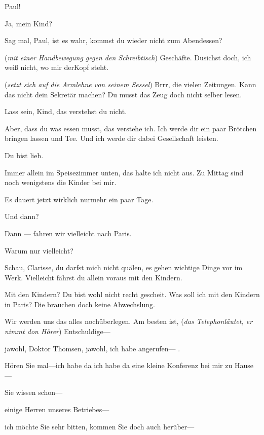 \documentclass[
	final,
	a4paper,
	ngerman,
	mpinclude = true, %
	twoside = true,
	open = right,
	cleardoublepage = plain,
	DIV = 13,
	BCOR = 1cm,
	titlepage = firstiscover,
	]{scrbook}
\newcommand{\direction}[1]{(\textit{#1})}
\newcommand{\thecharacter}[1]{\textup{\textsc{#1}}\xspace}
\newcommand{\theClarisse}{\thecharacter{Clarisse}}
\newcommand{\character}[1]{\item[#1]}
\newcommand{\Generaldirektor}{\character{Direktor}}
\newcommand{\Clarisse}{\character{\theClarisse}}
\begin{document}
\begin{play}

\Clarisse
Paul!

\Generaldirektor
Ja, mein Kind?

\Clarisse
Sag mal, Paul, ist es wahr, kommst du wieder nicht zum Abendessen?

\Generaldirektor
\direction{mit einer Handbewegung gegen den Schreibtisch} Geschäfte. Dusichst doch, ich weiß nicht, wo mir derKopf steht.

\Clarisse
\direction{setzt sich auf die Armlehne von seinem Sessel} Brrr, die vielen Zeitungen. Kann das nicht dein Sekretär machen? Du musst das Zeug doch nicht selber lesen.

\Generaldirektor
Lass sein, Kind, das verstehst du nicht.

\Clarisse
Aber, dass du was essen musst, das verstehe ich. Ich werde dir ein paar Brötchen bringen lassen und Tee. Und ich werde dir dabei Gesellschaft leisten.

\Generaldirektor
Du bist lieb.

\Clarisse
Immer allein im Speisezimmer unten, das halte ich nicht aus. Zu Mittag sind noch wenigstens die Kinder bei mir.

\Generaldirektor
Es dauert jetzt wirklich nurmehr ein paar Tage.

\Clarisse
Und dann?

\Generaldirektor
Dann --- fahren wir vielleicht nach Paris.

\Clarisse
Warum nur vielleicht?

\Generaldirektor
Schau, Clarisse, du darfst mich nicht quälen, es gehen wichtige Dinge vor im Werk. Vielleicht fährst du allein voraus mit den Kindern.

\Clarisse
Mit den Kindern? Du bist wohl nicht recht gescheit. Was soll ich mit den Kindern in Paris? Die brauchen doch keine Abwechslung.

\Generaldirektor
Wir werden uns das alles nochüberlegen. Am besten ist, \direction{das Telephonläutet, er nimmt don Hörer} Entschuldige---

jawohl, Doktor Thomsen, jawohl, ich habe angerufen--- .

Hören Sie mal---ich habe da ich habe da eine kleine Konferenz bei mir zu Hause---

Sie wissen schon---

einige Herren unseres Betriebes---

ich möchte Sie sehr bitten, kommen Sie doch auch herüber---


\end{play}
\end{document}
